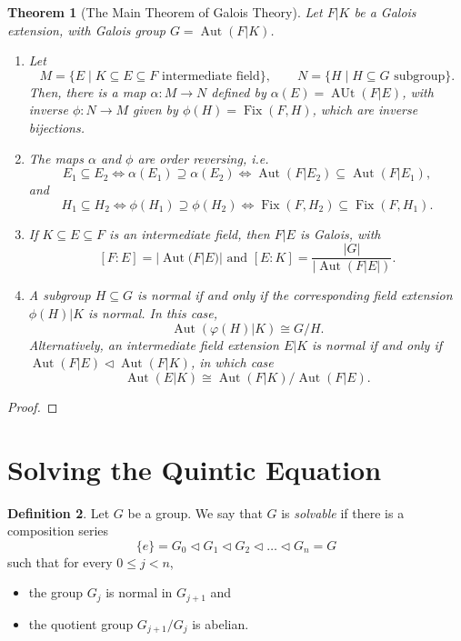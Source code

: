 \documentclass[a4paper, openany]{memoir}
\theoremstyle{definition}
\newtheorem{definition}{Definition}[section]
\theoremstyle{plain}
\newtheorem{theorem}[definition]{Theorem}
\begin{document}
    \begin{theorem}[The Main Theorem of Galois Theory]
        Let $F|K$ be a Galois extension, with Galois group $G = \operatorname{Aut}(F|K)$.
        \begin{enumerate}
            \item Let 
            \[M = \{E \mid K \subseteq E \subseteq F \textrm{ intermediate field}\}, \qquad N = \{H \mid H \subseteq G \textrm{ subgroup}\}.\]
            Then, there is a map $\alpha \colon M \to N$ defined by $\alpha(E) = \operatorname{AUt}(F|E)$, with inverse $\phi \colon N \to M$ given by $\phi(H) = \operatorname{Fix}(F, H)$, which are inverse bijections.

            \item The maps $\alpha$ and $\phi$ are order reversing, i.e.
            \[E_1 \subseteq E_2 \iff \alpha(E_1) \supseteq \alpha(E_2) \iff \operatorname{Aut}(F|E_2) \subseteq \operatorname{Aut}(F|E_1),\]
            and
            \[H_1 \subseteq H_2 \iff \phi(H_1) \supseteq \phi(H_2) \iff \operatorname{Fix}(F, H_2) \subseteq \operatorname{Fix}(F, H_1).\]

            \item If $K \subseteq E \subseteq F$ is an intermediate field, then $F|E$ is Galois, with
            \[[F : E] = |\operatorname{Aut}(F|E)| \textrm{ and } [E : K] = \frac{|G|}{|\operatorname{Aut}(F|E|)}.\]

            \item A subgroup $H \subseteq G$ is normal if and only if the corresponding field extension $\phi(H)|K$ is normal. In this case,
            \[\operatorname{Aut}(\varphi(H)|K) \cong G/H.\]
            Alternatively, an intermediate field extension $E|K$ is normal if and only if $\operatorname{Aut}(F|E) \vartriangleleft \operatorname{Aut}(F|K)$, in which case
            \[\operatorname{Aut}(E|K) \cong \operatorname{Aut}(F|K)/\operatorname{Aut}(F|E).\]
        \end{enumerate}
    \end{theorem}
    \begin{proof}
        
    \end{proof}
    
    \newpage

    \section{Solving the Quintic Equation}
    \begin{definition}
        Let $G$ be a group. We say that $G$ is \emph{solvable} if there is a composition series
        \[\{e\} = G_0 \vartriangleleft G_1 \vartriangleleft G_2 \vartriangleleft \dots \vartriangleleft G_n = G\]
        such that for every $0 \leq j < n$,
        \begin{itemize}
            \item the group $G_j$ is normal in $G_{j+1}$ and
            \item the quotient group $G_{j+1}/G_j$ is abelian.
        \end{itemize}
    \end{definition}
\end{document}
